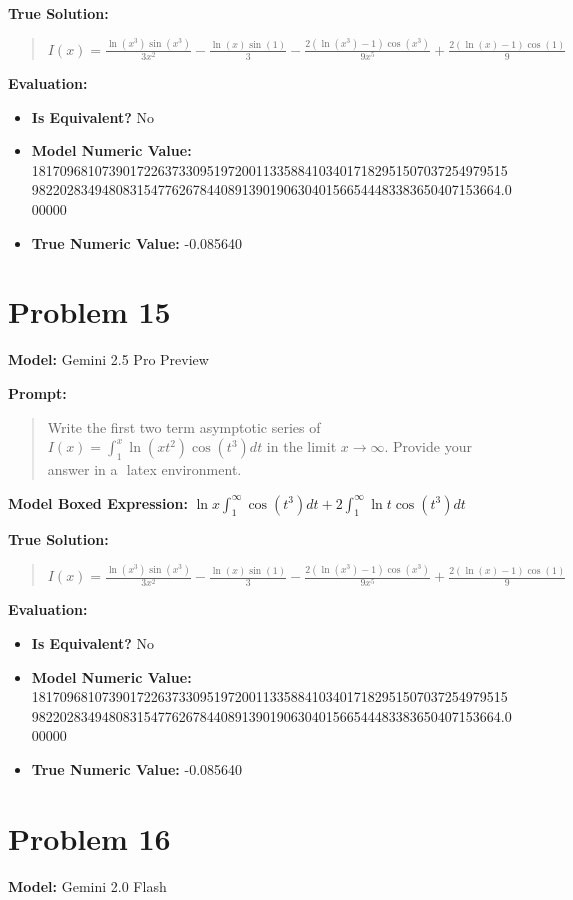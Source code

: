 \documentclass{article}
\begin{document}
\textbf{True Solution:}
\begin{quote}
$I(x) = \frac{\ln(x^3)\sin(x^3)}{3x^2} - \frac{\ln(x)\sin(1)}{3} -\frac{2(\ln(x^3)-1)\cos(x^3)}{9x^5} + \frac{2(\ln(x)-1)\cos(1)}{9}$
\end{quote}

\textbf{Evaluation:}
\begin{itemize}
\item \textbf{Is Equivalent?} No
\item \textbf{Model Numeric Value:} 181709681073901722637330951972001133588410340171829515070372549795159822028349480831547762678440891390190630401566544483383650407153664.000000
\item \textbf{True Numeric Value:} -0.085640
\end{itemize}
\vspace{1cm}
\section*{Problem 15}
\textbf{Model:} Gemini 2.5 Pro Preview

\textbf{Prompt:}
\begin{quote}
Write the first two term asymptotic series of $I(x) = \int^x_1 \ln(xt^2)\cos(t^3) dt$ in the limit $x \rightarrow \infty$. Provide your answer in a $\boxed{}$ latex environment.
\end{quote}
\textbf{Model Boxed Expression:} $\ln x \int_1^\infty \cos(t^3)dt + 2 \int_1^\infty \ln t \cos(t^3)dt$

\textbf{True Solution:}
\begin{quote}
$I(x) = \frac{\ln(x^3)\sin(x^3)}{3x^2} - \frac{\ln(x)\sin(1)}{3} -\frac{2(\ln(x^3)-1)\cos(x^3)}{9x^5} + \frac{2(\ln(x)-1)\cos(1)}{9}$
\end{quote}

\textbf{Evaluation:}
\begin{itemize}
\item \textbf{Is Equivalent?} No
\item \textbf{Model Numeric Value:} 181709681073901722637330951972001133588410340171829515070372549795159822028349480831547762678440891390190630401566544483383650407153664.000000
\item \textbf{True Numeric Value:} -0.085640
\end{itemize}
\vspace{1cm}
\section*{Problem 16}
\textbf{Model:} Gemini 2.0 Flash
\end{document}
